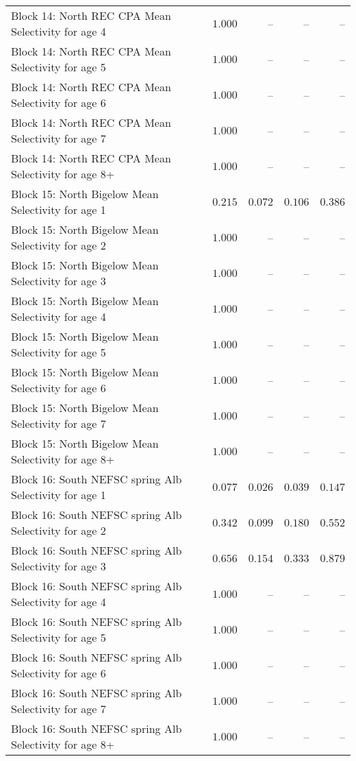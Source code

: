 \documentclass[
]{article}
\begin{document}
\begin{landscape}
\begin{longtable}[t]{lrrrr}
Block 14: North REC CPA Mean Selectivity for age 4 & $1.000$ & -- & -- & --\\
\addlinespace
Block 14: North REC CPA Mean Selectivity for age 5 & $1.000$ & -- & -- & --\\
Block 14: North REC CPA Mean Selectivity for age 6 & $1.000$ & -- & -- & --\\
Block 14: North REC CPA Mean Selectivity for age 7 & $1.000$ & -- & -- & --\\
Block 14: North REC CPA Mean Selectivity for age 8+ & $1.000$ & -- & -- & --\\
Block 15: North Bigelow Mean Selectivity for age 1 & $0.215$ & $0.072$ & $0.106$ & $0.386$\\
\addlinespace
Block 15: North Bigelow Mean Selectivity for age 2 & $1.000$ & -- & -- & --\\
Block 15: North Bigelow Mean Selectivity for age 3 & $1.000$ & -- & -- & --\\
Block 15: North Bigelow Mean Selectivity for age 4 & $1.000$ & -- & -- & --\\
Block 15: North Bigelow Mean Selectivity for age 5 & $1.000$ & -- & -- & --\\
Block 15: North Bigelow Mean Selectivity for age 6 & $1.000$ & -- & -- & --\\
\addlinespace
Block 15: North Bigelow Mean Selectivity for age 7 & $1.000$ & -- & -- & --\\
Block 15: North Bigelow Mean Selectivity for age 8+ & $1.000$ & -- & -- & --\\
Block 16: South NEFSC spring Alb Selectivity for age 1 & $0.077$ & $0.026$ & $0.039$ & $0.147$\\
Block 16: South NEFSC spring Alb Selectivity for age 2 & $0.342$ & $0.099$ & $0.180$ & $0.552$\\
Block 16: South NEFSC spring Alb Selectivity for age 3 & $0.656$ & $0.154$ & $0.333$ & $0.879$\\
\addlinespace
Block 16: South NEFSC spring Alb Selectivity for age 4 & $1.000$ & -- & -- & --\\
Block 16: South NEFSC spring Alb Selectivity for age 5 & $1.000$ & -- & -- & --\\
Block 16: South NEFSC spring Alb Selectivity for age 6 & $1.000$ & -- & -- & --\\
Block 16: South NEFSC spring Alb Selectivity for age 7 & $1.000$ & -- & -- & --\\
Block 16: South NEFSC spring Alb Selectivity for age 8+ & $1.000$ & -- & -- & --\\

\end{longtable}
\end{landscape}
\end{document}
